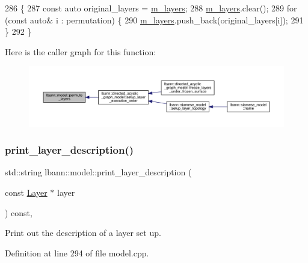 \begin{DoxyCode}
286                                                             \{
287   \textcolor{keyword}{const} \textcolor{keyword}{auto} original\_layers = \hyperlink{classlbann_1_1model_a0229fc226ec163d1411548446104569d}{m\_layers};
288   \hyperlink{classlbann_1_1model_a0229fc226ec163d1411548446104569d}{m\_layers}.clear();
289   \textcolor{keywordflow}{for} (\textcolor{keyword}{const} \textcolor{keyword}{auto}& i : permutation) \{
290     \hyperlink{classlbann_1_1model_a0229fc226ec163d1411548446104569d}{m\_layers}.push\_back(original\_layers[i]);
291   \}
292 \}
\end{DoxyCode}
Here is the caller graph for this function\+:\nopagebreak
\begin{figure}[H]
\begin{center}
\leavevmode
\includegraphics[width=350pt]{classlbann_1_1model_a31c281b63593a0ec7110664f7309b01a_icgraph}
\end{center}
\end{figure}
\mbox{\label{classlbann_1_1model_ab173fd93a80a2980059ff292c308cbf5}} 
\subsubsection{\texorpdfstring{print\+\_\+layer\+\_\+description()}{print\_layer\_description()}}
{\footnotesize\ttfamily std\+::string lbann\+::model\+::print\+\_\+layer\+\_\+description (\begin{DoxyParamCaption}\item[{const \hyperlink{classlbann_1_1Layer}{Layer} $\ast$}]{layer }\end{DoxyParamCaption}) const\hspace{0.3cm}{\ttfamily [protected]}, {\ttfamily [virtual]}}

Print out the description of a layer set up. 

Definition at line 294 of file model.\+cpp.


